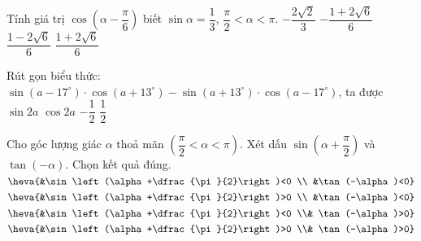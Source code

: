 \begin{ex}%
	Tính giá trị  $\cos \left(\alpha-\dfrac{\pi}{6}\right)$ biết $\sin \alpha=\dfrac{1}{3}$, $ \dfrac{\pi}{2}<\alpha<\pi$.
	\choice 
		{$-\dfrac{2  \sqrt{2}}{3}$}
		{$-\dfrac{1+2  \sqrt{6}}{6}$}
		{\True  $\dfrac{1-2 \sqrt{6}}{6}$}
		{$\dfrac{1+2 \sqrt{6}}{6}$} 
\end{ex}

\begin{ex}%
	Rút gọn biểu thức: $\sin \left(a-17^{\circ}\right) \cdot \cos \left(a+13^{\circ}\right)-\sin  \left(a+13^{\circ}\right) \cdot \cos \left(a-17^{\circ}\right)$, ta được
	\choice 
		{$\sin 2 a$} 
		{$\cos 2  a$}
		{\True $-\dfrac{1}{2}$} 
		 {$\dfrac{1}{2}$}
\end{ex}

\begin{ex}%
	Cho góc lượng giác $\alpha$ thoả mãn $\left(\dfrac{\pi}{2}<\alpha<\pi\right)$. Xét  dấu $\sin \left(\alpha+\dfrac{\pi}{2}\right)$ và $\tan (-\alpha)$. Chọn kết quả đúng.
	\choice 
		 {$\heva{&\sin \left(\alpha+\dfrac{\pi}{2}\right)<0 \\ &\tan (-\alpha)<0}$}
		{$\heva{&\sin  \left(\alpha+\dfrac{\pi}{2}\right)>0 \\ &\tan (-\alpha)<0}$}
		{\True $\heva{&\sin  \left(\alpha+\dfrac{\pi}{2}\right)<0 \\& \tan (-\alpha)>0}$}
		{$\heva{&\sin \left(\alpha+\dfrac{\pi}{2}\right)>0 \\& \tan (-\alpha)>0}$} 
\end{ex}

